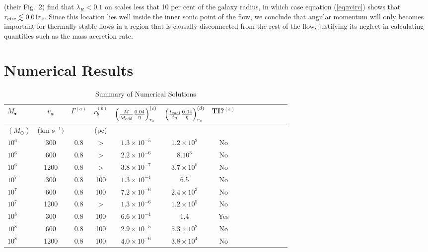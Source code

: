\documentclass[usenatbib,fleqn]{mn2e}
\begin{document}
\citet{EmsellemCappellari+:2007a} (their Fig.~2) find that $\lambda_R < 0.1$ on scales less that 10 per cent of the galaxy radius, in which case equation (\ref{eq:rcirc}) shows that $r_{\rm circ} \lesssim 0.01r_{s}$.  Since this location lies well inside the inner sonic point of the flow, we conclude that angular momentum will only becomes important for thermally stable flows in a region that is causally disconnected from the rest of the flow, justifying its neglect in calculating quantities such as the mass accretion rate.


\section{Numerical Results}
\label{sec:numerical}

\begin{table}
\begin{threeparttable}
\begin{minipage}{18cm}
\caption{Summary of Numerical Solutions}
\begin{tabular}{lccccccccccccc}
\hline
{$M_{\bullet}$} & {$v_{w}$} & {$\Gamma^{(a)}$} & {$r_b^{(b)}$} &
{$\left(\frac{\dot{M}}{\dot{M}_{\rm edd}}\frac{0.04}{\eta}\right)_{r_{s}}^{(c)}$} & {$\left(\frac{t_{\rm cool}}{t_{\rm ff}}\frac{0.04}{\eta}\right)_{r_s}^{(d)}$} & TI?$^{(e)}$ \\
\hline
$(M_{\odot})$ & (km s$^{-1})$ & & (pc) & & &  & \\
\hline
$    10^{ 6 }$ & 300 & 0.8 & $>$ & $ 1.3 \times 10^{ -5 }$ & $ 1.2 \times 10^{ 2 }$ & No \\
$    10^{ 6 }$ & 600 & 0.8 & $>$ & $ 2.2 \times 10^{ -6 }$ & $ 8. 10^{ 3 }$ & No \\
$    10^{ 6 }$ & 1200 & 0.8 & $>$ & $ 3.8 \times 10^{ -7 }$ & $ 3.7 \times 10^{ 5 }$ & No \\
$    10^{ 7 }$ & 300 & 0.8 & 100 & $ 1.3 \times 10^{ -4 }$ & 6.5 & No \\
$    10^{ 7 }$ & 600 & 0.8 & 100 & $ 7.2 \times 10^{ -6 }$ & $ 2.4 \times 10^{ 3 }$ & No \\
$    10^{ 7 }$ & 1200 & 0.8 & $>$ & $ 1.3 \times 10^{ -6 }$ & $ 1.2 \times 10^{ 5 }$ & No \\
$    10^{ 8 }$ & 300 & 0.8 & 100 & $ 6.6 \times 10^{ -4 }$ & 1.4 & Yes \\
$    10^{ 8 }$ & 600 & 0.8 & 100 & $ 2.9 \times 10^{ -5 }$ & $ 5.3 \times 10^{ 2 }$ & No \\
$    10^{ 8 }$ & 1200 & 0.8 & 100 & $ 4.0 \times 10^{ -6 }$ & $ 3.8 \times 10^{ 4 }$ & No \\

\end{tabular}
\end{minipage}
\end{threeparttable}
\end{table}
\end{document}
